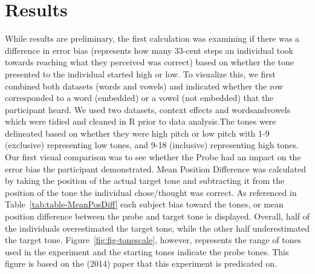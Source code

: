 \documentclass[
  man]{apa6}
\begin{document}
\hypertarget{results}{%
\section{Results}\label{results}}

While results are preliminary, the first calculation was examining if there was a difference in error bias (represents how many 33-cent steps an individual took towards reaching what they perceived was correct) based on whether the tone presented to the individual started high or low. To visualize this, we first combined both datasets (words and vowels) and indicated whether the row corresponded to a word (embedded) or a vowel (not embedded) that the participant heard. We used two datasets, context effects and wordsandvowels which were tidied and cleaned in R prior to data analysis.The tones were delineated based on whether they were high pitch or low pitch with 1-9 (exclusive) representing low tones, and 9-18 (inclusive) representing high tones. Our first visual comparison was to see whether the Probe had an impact on the error bias the participant demonstrated. Mean Position Difference was calculated by taking the position of the actual target tone and subtracting it from the position of the tone the individual chose/thought was correct. As referenced in Table~\ref{tab:table-MeanPosDiff} each subject bias toward the tones, or mean position difference between the probe and target tone is displayed. Overall, half of the individuals overestimated the target tone, while the other half underestimated the target tone. Figure~\ref{fig:fig-tonescale}, however, represents the range of tones used in the experiment and the starting tones indicate the probe tones. This figure is based on the (2014) paper that this experiment is predicated on.
\end{document}
